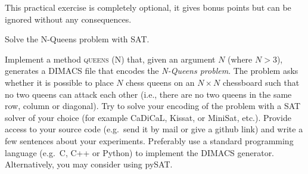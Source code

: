 \documentclass[addpoints,12pt]{exam}
\begin{document}
\begin{questions}

\newpage


\bonusquestion[15]
\vspace*{5pt}

This practical exercise is completely optional, it gives bonus points but can be ignored without any consequences.

Solve the N-Queens problem with SAT. 

Implement a method \textsc{queens (N)} that, given an argument $N$ (where $N>3$), generates a DIMACS file that
encodes the \textit{N-Queens problem}.
The problem asks whether it is possible to place $N$ chess queens on an $N \times N$ chessboard such
that no two queens can attack each other (i.e., there are no two queens in the same row, column or
diagonal).
Try to solve your encoding of the problem with a SAT solver of your choice (for example CaDiCaL, Kissat, or MiniSat, etc.).
Provide access to your source code (e.g.~send it by mail or give a github link) and write a few sentences about your experiments.
Preferably use a standard programming language (e.g.~C, C++ or Python) to implement the DIMACS generator.
Alternatively, you may consider using pySAT.

\end{questions}
\end{document}
